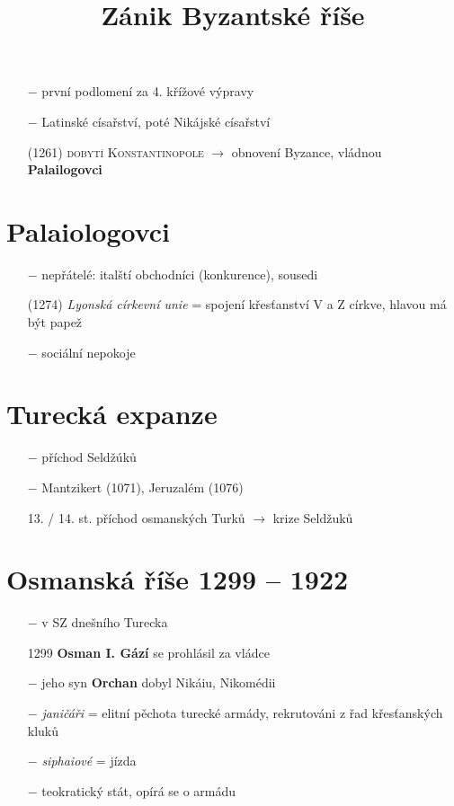 \documentclass{article}
\title{\vspace{-2cm}Zánik Byzantské říše\vspace{-1.7cm}}
\date{}
\author{}
\begin{document}
\maketitle

\begin{itemize}
    \vspace{-0.5em}
    \setlength\itemsep{0.15em}
    \item[$-$] první podlomení za 4. křížové výpravy
    \item[$-$] Latinské císařství, poté Nikájské císařství
    \item[(1261)] \textsc{dobytí Konstantinopole} $\rightarrow$ obnovení Byzance, vládnou \textbf{Palailogovci}
\end{itemize}

\section*{Palaiologovci}
\begin{itemize}
    \vspace{-0.5em}
    \setlength\itemsep{0.15em}
    \item[$-$] nepřátelé: italští obchodníci (konkurence), sousedi
    \item[(1274)] \textit{Lyonská církevní unie} = spojení křesťanství V a Z církve, hlavou má být papež
    \item[$-$] sociální nepokoje
\end{itemize}


\section*{Turecká expanze}
\begin{itemize}
    \vspace{-0.5em}
    \setlength\itemsep{0.15em}
    \item[$-$] příchod Seldžúků
    \item[$-$] Mantzikert (1071), Jeruzalém (1076)
    \item[13. / 14. st.] příchod osmanských Turků $\rightarrow$ krize Seldžuků
\end{itemize}


\section*{Osmanská říše 1299 -- 1922}
\begin{itemize}
    \vspace{-0.5em}
    \setlength\itemsep{0.15em}
    \item[$-$] v SZ dnešního Turecka
    \item[1299] \textbf{Osman I. Gází} se prohlásil za vládce
    \item[$-$] jeho syn \textbf{Orchan} dobyl Nikáiu, Nikomédii
    \item[$-$] \textit{janičáři} = elitní pěchota turecké armády, rekrutováni z řad křesťanských kluků
    \item[$-$] \textit{siphaiové} = jízda
    \item[$-$] teokratický stát, opírá se o armádu
\end{itemize}
\end{document}

